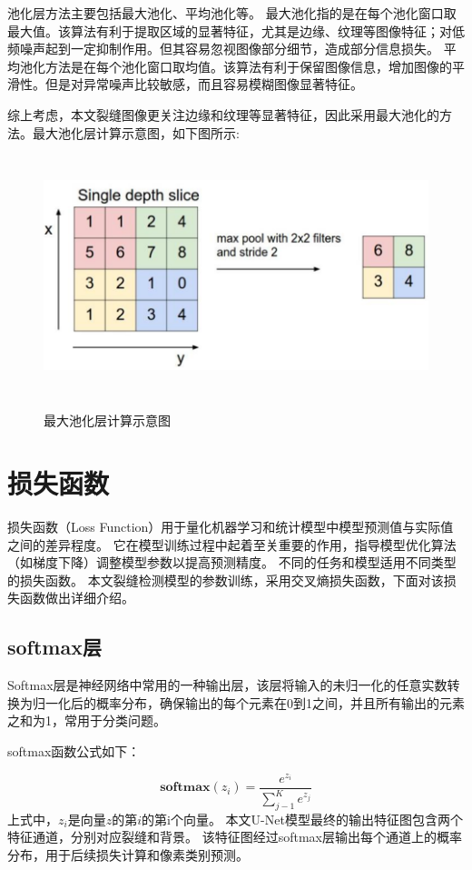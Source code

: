 池化层方法主要包括最大池化、平均池化等。
最大池化指的是在每个池化窗口取最大值。该算法有利于提取区域的显著特征，尤其是边缘、纹理等图像特征；对低频噪声起到一定抑制作用。但其容易忽视图像部分细节，造成部分信息损失。
平均池化方法是在每个池化窗口取均值。该算法有利于保留图像信息，增加图像的平滑性。但是对异常噪声比较敏感，而且容易模糊图像显著特征。

综上考虑，本文裂缝图像更关注边缘和纹理等显著特征，因此采用最大池化的方法。最大池化层计算示意图，如下图所示:

\begin{figure}
	\includegraphics[width=14cm, height=7cm]{pic/pool-compute.png}
	\label{pool}
	\caption{最大池化层计算示意图}
\end{figure}

\section{损失函数}
损失函数（Loss Function）用于量化机器学习和统计模型中模型预测值与实际值之间的差异程度。
它在模型训练过程中起着至关重要的作用，指导模型优化算法（如梯度下降）调整模型参数以提高预测精度。
不同的任务和模型适用不同类型的损失函数。
本文裂缝检测模型的参数训练，采用交叉熵损失函数，下面对该损失函数做出详细介绍。

\subsection{softmax层}
Softmax层是神经网络中常用的一种输出层，该层将输入的未归一化的任意实数转换为归一化后的概率分布，确保输出的每个元素在0到1之间，并且所有输出的元素之和为1，常用于分类问题。

softmax函数公式如下：

\begin{equation}
	\mathbf{softmax}(z_{i})=\frac{e^{z_{i}}}{\sum_{j-1}^{K} e^{z_{j}}}
\end{equation}
上式中，$z_i$是向量$z$的第$i$的第i个向量。
本文U-Net模型最终的输出特征图包含两个特征通道，分别对应裂缝和背景。
该特征图经过softmax层输出每个通道上的概率分布，用于后续损失计算和像素类别预测。

